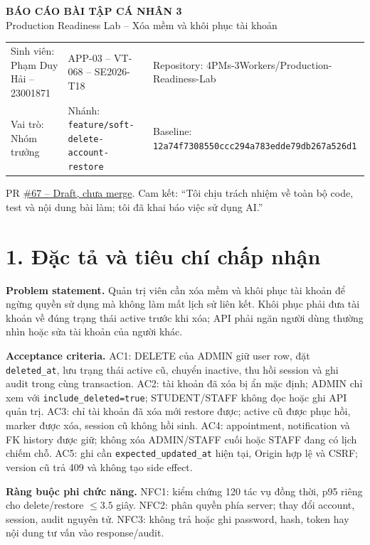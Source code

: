 \documentclass[10pt,a4paper]{article}
\begin{document}
\begin{center}
{\LARGE\bfseries\color{navy} BÁO CÁO BÀI TẬP CÁ NHÂN 3}\\[-1pt]
{\normalsize\color{teal} Production Readiness Lab -- Xóa mềm và khôi phục tài khoản}
\end{center}
\vspace{-4pt}
\begin{tabular}{p{.29\linewidth}p{.34\linewidth}p{.31\linewidth}}
\toprule
Sinh viên: Phạm Duy Hải -- 23001871 & APP-03 -- VT-068 -- SE2026-T18 & Repository: 4PMs-3Workers/Production-Readiness-Lab\\
Vai trò: Nhóm trưởng & Nhánh: \texttt{feature/soft-delete-account-restore} & Baseline: \texttt{12a74f7308550ccc294a783edde79db267a526d1}\\
\bottomrule
\end{tabular}

PR \href{https://github.com/4PMs-3Workers/Production-Readiness-Lab/pull/67}{\#67 -- Draft, chưa merge}. Cam kết: “Tôi chịu trách nhiệm về toàn bộ code, test và nội dung bài làm; tôi đã khai báo việc sử dụng AI.”

\section*{1. Đặc tả và tiêu chí chấp nhận}
\textbf{Problem statement.} Quản trị viên cần xóa mềm và khôi phục tài khoản để ngừng quyền sử dụng mà không làm mất lịch sử liên kết. Khôi phục phải đưa tài khoản về đúng trạng thái active trước khi xóa; API phải ngăn người dùng thường nhìn hoặc sửa tài khoản của người khác.

\textbf{Acceptance criteria.} AC1: DELETE của ADMIN giữ user row, đặt \texttt{deleted\_at}, lưu trạng thái active cũ, chuyển inactive, thu hồi session và ghi audit trong cùng transaction. AC2: tài khoản đã xóa bị ẩn mặc định; ADMIN chỉ xem với \texttt{include\_deleted=true}; STUDENT/STAFF không đọc hoặc ghi API quản trị. AC3: chỉ tài khoản đã xóa mới restore được; active cũ được phục hồi, marker được xóa, session cũ không hồi sinh. AC4: appointment, notification và FK history được giữ; không xóa ADMIN/STAFF cuối hoặc STAFF đang có lịch chiếm chỗ. AC5: ghi cần \texttt{expected\_updated\_at} hiện tại, Origin hợp lệ và CSRF; version cũ trả 409 và không tạo side effect.

\textbf{Ràng buộc phi chức năng.} NFC1: kiểm chứng 120 tác vụ đồng thời, p95 riêng cho delete/restore $\leq 3.5$ giây. NFC2: phân quyền phía server; thay đổi account, session, audit nguyên tử. NFC3: không trả hoặc ghi password, hash, token hay nội dung tư vấn vào response/audit.
\end{document}
